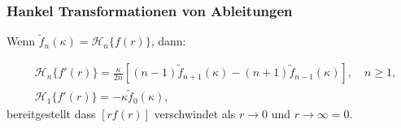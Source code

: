 \subsubsection{Hankel Transformationen von Ableitungen \label{subsub:ableitungen}}
Wenn $\tilde{f}_n(\kappa)=\mathscr{H}_n\{f(r)\}$, dann:

\begin{align}
	&\mathscr{H}_n\{f'(r)\}=\frac{\kappa}{2n}\left[(n-1)\tilde{f}_{n+1}(\kappa)-(n+1)\tilde{f}_{n-1}(\kappa)\right], \quad n\geq1, \\
	&\mathscr{H}_1\{f'(r)\}=-\kappa \tilde{f}_0(\kappa),
\end{align}
bereitgestellt dass $[rf(r)]$ verschwindet als $r\to0$ und $r\to\infty=0$.